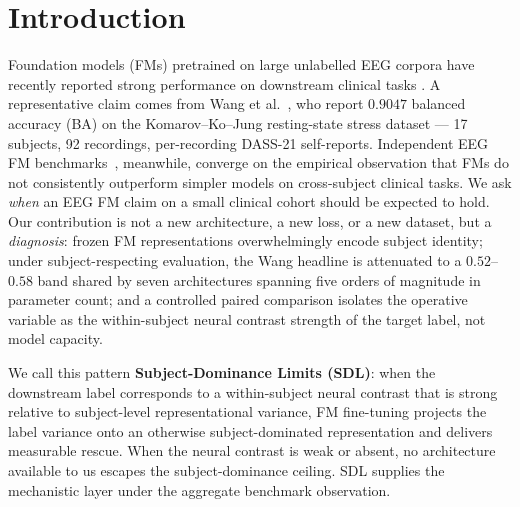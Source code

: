 \section{Introduction}
\label{sec:intro}

Foundation models (FMs) pretrained on large unlabelled EEG corpora have
recently reported strong performance on downstream clinical tasks
\citep{labram2024,cbramod2025,reve2025,kauffmann2025critique}. A
representative claim comes from Wang et al.\ \citep{wang2025stress},
who report $0.9047$ balanced accuracy (BA) on the Komarov--Ko--Jung
resting-state stress dataset \citep{komarov2020stress} ---
17 subjects, 92 recordings, per-recording DASS-21 self-reports.
Independent EEG FM
benchmarks~\citep{brain4fms2026,eegfmbench2025,adabrain2025,eegbench2025},
meanwhile, converge on the empirical observation that FMs do not
consistently outperform simpler models on cross-subject clinical
tasks. We ask \emph{when} an EEG FM claim on a small clinical cohort
should be expected to hold. Our contribution is not a new
architecture, a new loss, or a new dataset, but a \emph{diagnosis}:
frozen FM representations overwhelmingly encode subject identity;
under subject-respecting evaluation, the Wang headline is
attenuated to a $0.52$--$0.58$ band shared by seven architectures
spanning five orders of magnitude in parameter count; and a
controlled paired comparison isolates the operative variable as the
within-subject neural contrast strength of the target label, not
model capacity.

We call this pattern \textbf{Subject-Dominance Limits (SDL)}: when the
downstream label corresponds to a within-subject neural contrast that
is strong relative to subject-level representational variance, FM
fine-tuning projects the label variance onto an otherwise
subject-dominated representation and delivers measurable rescue.
When the neural contrast is weak or absent, no architecture available
to us escapes the subject-dominance ceiling. SDL supplies the
mechanistic layer under the aggregate benchmark observation.

